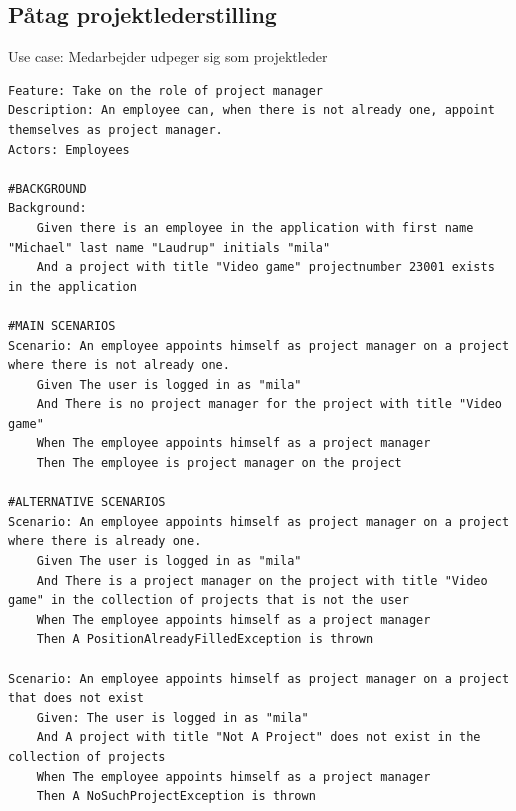 \subsection{Påtag projektlederstilling} 
\begin{listing}[H]
    \centering
    \caption{Use case: Medarbejder udpeger sig som projektleder} \label{lst:usecase_bliv_projektleder}
    \begin{verbatim}  
Feature: Take on the role of project manager
Description: An employee can, when there is not already one, appoint themselves as project manager.
Actors: Employees

#BACKGROUND
Background:
    Given there is an employee in the application with first name "Michael" last name "Laudrup" initials "mila"
    And a project with title "Video game" projectnumber 23001 exists in the application

#MAIN SCENARIOS
Scenario: An employee appoints himself as project manager on a project where there is not already one.
    Given The user is logged in as "mila"
    And There is no project manager for the project with title "Video game"
    When The employee appoints himself as a project manager
    Then The employee is project manager on the project

#ALTERNATIVE SCENARIOS
Scenario: An employee appoints himself as project manager on a project where there is already one.
    Given The user is logged in as "mila"
    And There is a project manager on the project with title "Video game" in the collection of projects that is not the user
    When The employee appoints himself as a project manager
    Then A PositionAlreadyFilledException is thrown

Scenario: An employee appoints himself as project manager on a project that does not exist
    Given: The user is logged in as "mila"
    And A project with title "Not A Project" does not exist in the collection of projects
    When The employee appoints himself as a project manager
    Then A NoSuchProjectException is thrown
    \end{verbatim}
\end{listing}


